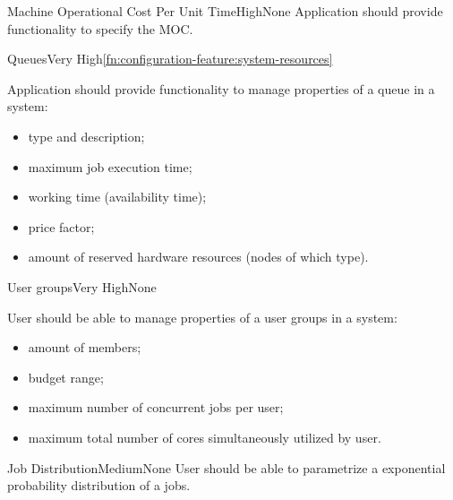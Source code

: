 	\begin{functional}{Machine Operational Cost Per Unit Time}{High}{None}
		\label{fn:configuration-feature:machine-opertional-cost-per-unit-time}
		{
			Application should provide functionality to specify the \gls{MOC}. 
		}
	\end{functional}

	\begin{functional}{Queues}{Very High}{\ref{fn:configuration-feature:system-resources}}
		\label{fn:configuration-feature:queues}
		{
			Application should provide functionality to manage properties of a queue in a system:
			\begin{itemize}
				\item type and description;
				\item maximum job execution time;
				\item working time (availability time);
				\item price factor;
				\item amount of reserved hardware resources (nodes of which type).
			\end{itemize} 
		}
	\end{functional}

	\begin{functional}{User groups}{Very High}{None}
		\label{fn:configuration-feature:user-groups}
		{
			User should be able to manage properties of a user groups in a system:
			\begin{itemize}
				\item amount of members;
				\item budget range;
				\item maximum number of concurrent jobs per user;
				\item maximum total number of cores simultaneously utilized by user.
			\end{itemize} 
		}
	\end{functional}

	\begin{functional}{Job Distribution}{Medium}{None}
		\label{fn:configuration-feature:job-distribution}
		{
			User should be able to parametrize a exponential probability distribution of a jobs. 
		}
	\end{functional}

